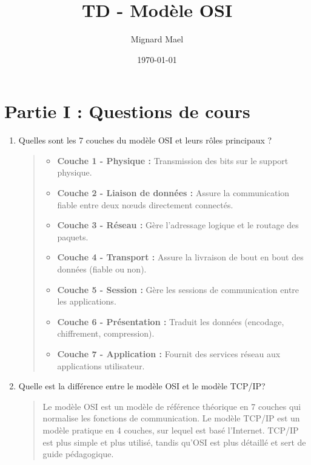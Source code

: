 \documentclass[a4paper,12pt]{article}
\title{TD - Modèle OSI}
\author{Mignard Mael}
\date{\today}
\begin{document}
\maketitle

\section*{Partie I : Questions de cours}
\begin{enumerate}
    \item Quelles sont les 7 couches du modèle OSI et leurs rôles principaux ?
    \begin{quote}
        \begin{itemize}
            \item \textbf{Couche 1 - Physique :} Transmission des bits sur le support physique.
            \item \textbf{Couche 2 - Liaison de données :} Assure la communication fiable entre deux nœuds directement connectés.
            \item \textbf{Couche 3 - Réseau :} Gère l'adressage logique et le routage des paquets.
            \item \textbf{Couche 4 - Transport :} Assure la livraison de bout en bout des données (fiable ou non).
            \item \textbf{Couche 5 - Session :} Gère les sessions de communication entre les applications.
            \item \textbf{Couche 6 - Présentation :} Traduit les données (encodage, chiffrement, compression).
            \item \textbf{Couche 7 - Application :} Fournit des services réseau aux applications utilisateur.
        \end{itemize}
    \end{quote}

    \item Quelle est la différence entre le modèle OSI et le modèle TCP/IP?
    \begin{quote}
        Le modèle OSI est un modèle de référence théorique en 7 couches qui normalise les fonctions de communication. Le modèle TCP/IP est un modèle pratique en 4 couches, sur lequel est basé l'Internet. TCP/IP est plus simple et plus utilisé, tandis qu'OSI est plus détaillé et sert de guide pédagogique.
    \end{quote}


\end{enumerate}
\end{document}
